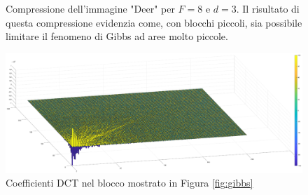 \begin{figure}%
	\centering
	\caption{Compressione dell'immagine "Deer" per $F=8$ e $d=3$. Il risultato di questa compressione evidenzia come, con blocchi piccoli, sia possibile limitare il fenomeno di Gibbs ad aree molto piccole.}%
	\label{fig:gibbs_small}
\end{figure}

\begin{figure}
	\centering
	\includegraphics[width=1\linewidth]{figures/dct_values_3d.eps}
	\caption{Coefficienti DCT nel blocco mostrato in Figura \ref{fig:gibbs}}
	\label{fig:dct_values_on_gibbs}
\end{figure}

